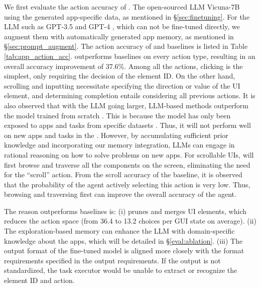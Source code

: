 We first evaluate the action accuracy of \name. The open-sourced LLM Vicuna-7B \cite{vicuna2023}  using the generated app-specific data, as mentioned in \S \ref{sec:finetuning}. For the  LLM such as GPT-3.5 \cite{chatgpt} and GPT-4 \cite{openai2023gpt4}, which can not be fine-tuned directly, we augment them with automatically generated app memory, as mentioned in \S \ref{sec:prompt_augment}. 
The action accuracy of \name and baselines is listed in Table \ref{tab:app_action_acc}. 
\name outperforms baselines on every action type, resulting in an overall accuracy improvement of 37.6\%. 
Among all the actions, clicking is the simplest, only requiring the decision of the element ID. On the other hand, scrolling and inputting necessitate specifying the direction or value of the UI element, and determining completion entails considering all previous actions.%
It is also observed that with the LLM going larger, LLM-based methods outperform the model trained from scratch \cite{metagui}. This is because the model has only been exposed to apps and tasks from specific datasets \cite{motif}. 
Thus, it will not perform well on new apps and tasks in the \datasetname. However, by accumulating sufficient prior knowledge and incorporating our memory integration, LLMs can engage in rational reasoning on how to solve problems on new apps.
For scrollable UIs, \name will first browse and traverse all the components on the screen, eliminating the need for the ``scroll'' action. From the scroll accuracy of the baseline, it is observed that the probability of the agent actively selecting this action is very low. Thus, browsing and traversing first can improve the overall accuracy of the agent. 

The reason \name outperforms baselines is: (i) \name prunes and merges UI elements, which reduces the action space (from 36.4 to 13.2 choices per GUI state on average). (ii) The exploration-based memory can enhance the LLM with domain-specific knowledge about the apps, which will be detailed in \S \ref{eval:ablation}. (iii) The output format of the fine-tuned model is aligned more closely with the format requirements specified in the output requirements. If the output is not standardized, the task executor would be unable to extract or recognize the element ID and action.

